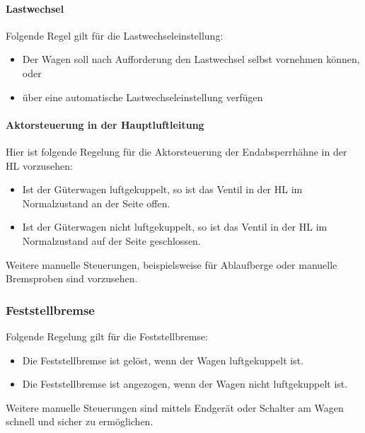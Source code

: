 \paragraph{Lastwechsel}
\begin{feat}
Folgende Regel gilt für die \gls{Lastwechsel}einstellung:
\begin{itemize}
    \item Der Wagen soll nach Aufforderung den \gls{Lastwechsel} selbst vornehmen können, oder
    \item über eine automatische \gls{Lastwechsel}einstellung verfügen
\end{itemize}
\end{feat}

\paragraph{Aktorsteuerung in der Hauptluftleitung}
\begin{feat}
Hier ist folgende Regelung für die Aktorsteuerung der Endabsperrhähne in der \acrshort{HL} vorzusehen:
\begin{itemize}
    \item Ist der Güterwagen luftgekuppelt, so ist das Ventil in der \acrshort{HL} im Normalzustand an der Seite offen.
    \item Ist der Güterwagen nicht luftgekuppelt, so ist das Ventil in der \acrshort{HL} im Normalzustand auf der Seite geschlossen.
\end{itemize}
\end{feat}
\begin{rem} [zu Anf. 47]
Weitere manuelle Steuerungen, beispielsweise für Ablaufberge oder manuelle Bremsproben sind vorzusehen.
\end{rem}

\subsubsection{Feststellbremse}
\begin{feat}
Folgende Regelung gilt für die Feststellbremse:
\begin{itemize}
    \item Die Feststellbremse ist gelöst, wenn der Wagen luftgekuppelt ist.
    \item Die Feststellbremse ist angezogen, wenn der Wagen nicht luftgekuppelt ist.
\end{itemize}
\end{feat}
\begin{rem} [zu Anf. 48]
Weitere manuelle Steuerungen sind mittels Endgerät oder \newline Schalter am Wagen schnell und sicher zu ermöglichen.
\end{rem}

